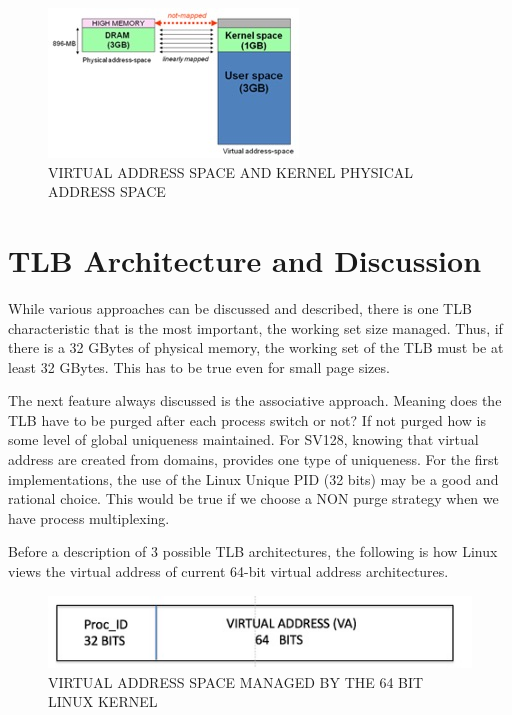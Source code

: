 \documentclass{article}
\begin{document}
\begin{figure}
\begin{center}
\includegraphics[scale = .5]
{figures/figure10_kernel_physical.jpg}
\caption{VIRTUAL ADDRESS SPACE AND KERNEL PHYSICAL ADDRESS SPACE}
\end{center}
\end{figure}


\section{TLB Architecture and Discussion}

While  various approaches can be discussed and described,  there is one TLB characteristic that is the most important,  the working set size managed.   Thus, if there is a 32 GBytes of physical memory,  the working set of the TLB must be at least 32 GBytes.  This has to be true even for small page sizes.

The next feature always discussed is the associative approach.  Meaning does the TLB have to be purged after each process switch or not?   If not purged how is some level of global uniqueness maintained.  For SV128,  knowing that virtual address are created from domains, provides one type of uniqueness.    For the first implementations,   the use of the Linux Unique PID (32 bits) may be a good and rational choice.  This would be true if we choose a NON purge strategy when we have process multiplexing.

Before a description of 3 possible TLB architectures,  the following is how Linux views the virtual address of current 64-bit virtual address architectures.

\begin{figure}
\begin{center}
\includegraphics[scale = .7]{figures/figure11_linux_kernel_address.jpg}
\caption{VIRTUAL ADDRESS SPACE MANAGED BY THE 64 BIT LINUX KERNEL}
\end{center}
\end{figure}
\end{document}
